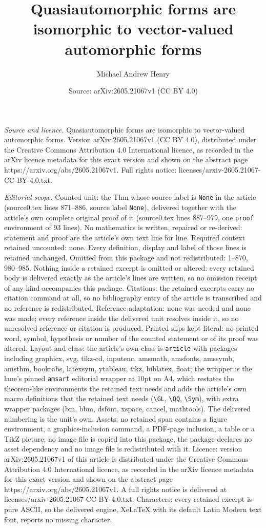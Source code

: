 \documentclass[10pt,a4paper]{amsart}
\title[Quasiautomorphic forms are isomorphic to vector-valued autom]{Quasiautomorphic forms are isomorphic to vector-valued automorphic forms}
\author{Michael Andrew Henry}
\date{Source: arXiv:2605.21067v1 (CC BY 4.0)}
\begin{document}
\maketitle

\noindent\emph{Source and licence.} Quasiautomorphic forms are isomorphic to vector-valued automorphic forms. Version arXiv:2605.21067v1 (CC BY 4.0), distributed under the Creative Commons Attribution 4.0 International licence, as recorded in the arXiv licence metadata for this exact version and shown on the abstract page https://arxiv.org/abs/2605.21067v1. Full rights notice: licenses/arxiv-2605.21067-CC-BY-4.0.txt.\par\smallskip

\noindent\textit{Editorial scope.} Counted unit: the Thm whose source label is \texttt{None} in the article (source0.tex lines 871--886, source label \texttt{None}), delivered together with the article's own complete original proof of it (source0.tex lines 887--979, one \texttt{proof} environment of 93 lines). No mathematics is written, repaired or re-derived: statement and proof are the article's own text line for line. Required context retained uncounted: none. Every definition, display and label of those lines is retained unchanged. Omitted from this package and not redistributed: 1--870, 980--985. Nothing inside a retained excerpt is omitted or altered: every retained body is delivered exactly as the article's lines are written, so no omission receipt of any kind accompanies this package. Citations: the retained excerpts carry no citation command at all, so no bibliography entry of the article is transcribed and no reference is redistributed. Reference adaptation: none was needed and none was made; every reference inside the delivered unit resolves inside it, so no unresolved reference or citation is produced. Printed slips kept literal: no printed word, symbol, hypothesis or number of the counted statement or of its proof was altered. Layout and class: the article's own class is \texttt{article} with packages including graphicx, svg, tikz-cd, inputenc, amsmath, amsfonts, amssymb, amsthm, booktabs, latexsym, ytableau, tikz, biblatex, float; the wrapper is the lane's pinned \texttt{amsart} editorial wrapper at 10pt on A4, which restates the theorem-like environments the retained text needs and adds the article's own macro definitions that the retained text needs (\texttt{\textbackslash GL}, \texttt{\textbackslash QQ}, \texttt{\textbackslash Sym}), with extra wrapper packages (bm, bbm, dsfont, xspace, cancel, mathtools). The delivered numbering is the unit's own. Assets: no retained span contains a figure environment, a graphics-inclusion command, a PDF-page inclusion, a table or a TikZ picture; no image file is copied into this package, the package declares no asset dependency and no image file is redistributed with it. Licence: version arXiv:2605.21067v1 of this article is distributed under the Creative Commons Attribution 4.0 International licence, as recorded in the arXiv licence metadata for this exact version and shown on the abstract page https://arxiv.org/abs/2605.21067v1. A full rights notice is delivered at licenses/arxiv-2605.21067-CC-BY-4.0.txt. Characters: every retained excerpt is pure ASCII, so the delivered engine, XeLaTeX with its default Latin Modern text font, reports no missing character.
\end{document}
